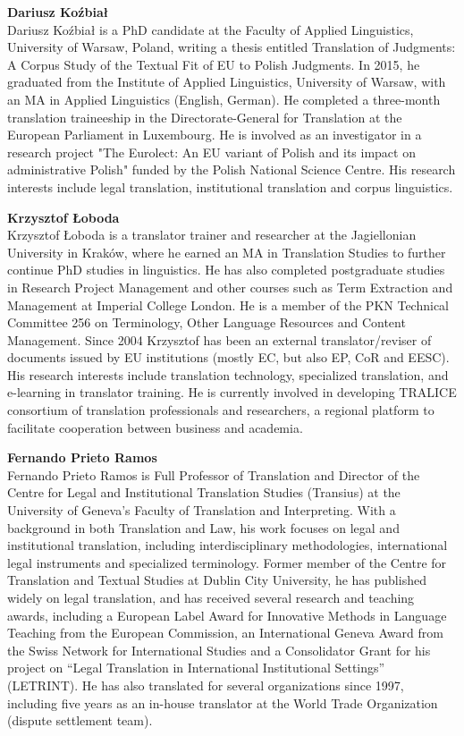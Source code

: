 \medskip\noindent
\textbf{Dariusz Koźbiał}\\
Dariusz Koźbiał is a PhD candidate at the Faculty of Applied Linguistics, University of Warsaw, Poland, writing a thesis entitled Translation of Judgments: A Corpus Study of the Textual Fit of EU to Polish Judgments. In 2015, he graduated from the Institute of Applied Linguistics, University of Warsaw, with an MA in Applied Linguistics (English, German). He completed a three-month translation traineeship in the Directorate-General for Translation at the European Parliament in Luxembourg. He is involved as an investigator in a research project "The Eurolect: An EU variant of Polish and its impact on administrative Polish" funded by the Polish National Science Centre. His research interests include legal translation, institutional translation and corpus linguistics.

\medskip\noindent
\textbf{Krzysztof Łoboda }\\
Krzysztof Łoboda is a translator trainer and researcher at the Jagiellonian University in Kraków, where he earned an MA in Translation Studies to further continue PhD studies in linguistics. He has also completed postgraduate studies in Research Project Management and other courses such as Term Extraction and Management at Imperial College London. He is a member of the PKN Technical Committee 256 on Terminology, Other Language Resources and Content Management. Since 2004 Krzysztof has been an external translator/reviser of documents issued by EU institutions (mostly EC, but also EP, CoR and EESC). His research interests include translation technology, specialized translation, and e-learning in translator training. He is currently involved in developing TRALICE consortium of translation professionals and researchers, a regional platform to facilitate cooperation between business and academia.

\medskip\noindent\largerpage
\textbf{Fernando Prieto Ramos }\\
Fernando Prieto Ramos is Full Professor of Translation and Director of the Centre for Legal and Institutional Translation Studies (Transius) at the University of Geneva's Faculty of Translation and Interpreting. With a background in both Translation and Law, his work focuses on legal and institutional translation, including interdisciplinary methodologies, international legal instruments and specialized terminology. Former member of the Centre for Translation and Textual Studies at Dublin City University, he has published widely on legal translation, and has received several research and teaching awards, including a European Label Award for Innovative Methods in Language Teaching from the European Commission, an International Geneva Award from the Swiss Network for International Studies and a Consolidator Grant for his project on “Legal Translation in International Institutional Settings” (LETRINT). He has also translated for several organizations since 1997, including five years as an in-house translator at the World Trade Organization (dispute settlement team).

